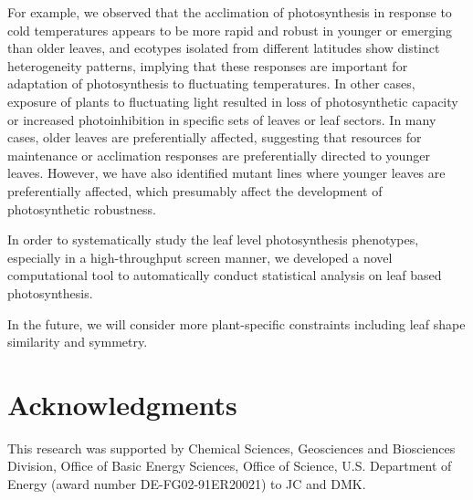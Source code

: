 \documentclass{bioinfo}
\begin{document}
For example, we observed that the acclimation of photosynthesis in response to cold temperatures appears to be more rapid and robust in younger or emerging than older leaves, and ecotypes isolated from different latitudes show distinct heterogeneity patterns, implying that these responses are important for adaptation of photosynthesis to fluctuating temperatures.
%
In other cases, exposure of plants to fluctuating light resulted in loss of photosynthetic capacity or increased photoinhibition in specific sets of leaves or leaf sectors. In many cases, older leaves are preferentially affected, suggesting that resources for maintenance or acclimation responses are preferentially directed to younger leaves. However, we have also identified mutant lines where younger leaves are preferentially affected, which presumably affect the development of photosynthetic robustness.

In order to systematically study the leaf level photosynthesis phenotypes, especially in a high-throughput screen manner, we developed a novel computational tool to automatically conduct statistical analysis on leaf based photosynthesis.

In the future, we will consider more plant-specific constraints including leaf shape similarity and symmetry.


\section*{Acknowledgments}\scriptsize
This research was supported by Chemical Sciences, Geosciences and Biosciences Division, Office of Basic Energy Sciences, Office of Science, U.S. Department of Energy (award number DE-FG02-91ER20021) to JC and DMK.



\scriptsize
%

\end{document}
